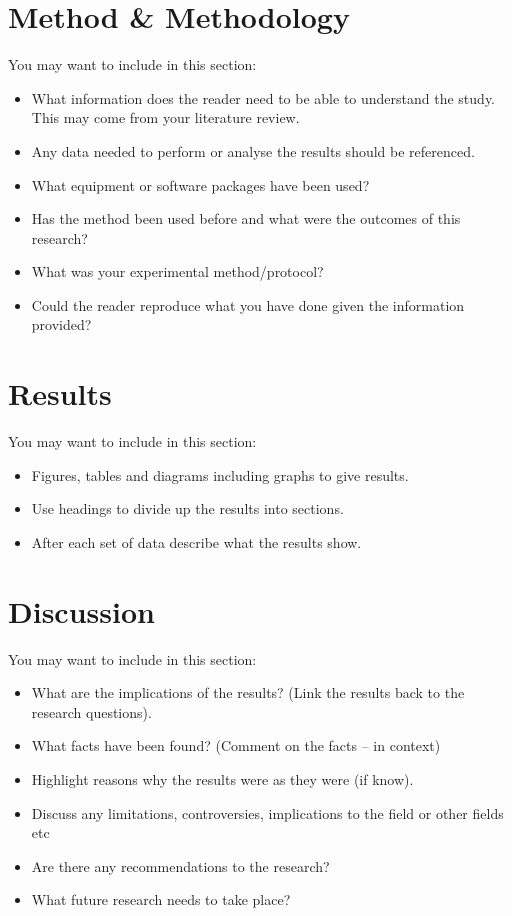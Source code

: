 \documentclass{bcrre_lab_report}
\begin{document}
\section{Method \& Methodology}
You may want to include in this section:
\begin{itemize}
    \item What information does the reader need to be able to understand the study. This may come from your literature review. 
    \item Any data needed to perform or analyse the results should be referenced.
    \item What equipment or software packages have been used?
    \item Has the method been used before and what were the outcomes of this research?
    \item What was your experimental method/protocol?
    \item Could the reader reproduce what you have done given the information provided?
\end{itemize}


\section{Results}
You may want to include in this section:
\begin{itemize}
    \item Figures, tables and diagrams including graphs to give results.
    \item Use headings to divide up the results into sections.
    \item After each set of data describe what the results show.
\end{itemize}

\section{Discussion}
You may want to include in this section:
\begin{itemize}
    \item What are the implications of the results? (Link the results back to the research questions).
    \item What facts have been found? (Comment on the facts – in context)
    \item Highlight reasons why the results were as they were (if know).
    \item Discuss any limitations, controversies, implications to the field or other fields etc
    \item Are there any recommendations to the research?
    \item What future research needs to take place?
\end{itemize}
\end{document}
